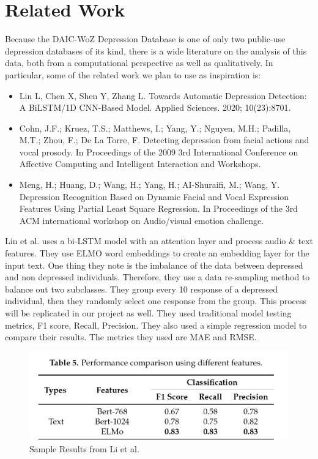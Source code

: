 \section{Related Work}

Because the DAIC-WoZ Depression Database is one of only two public-use depression databases of its kind, there is a wide literature on the analysis of this data, both from a computational perspective as well as qualitatively. In particular, some of the related work we plan to use as inspiration is:

\begin{itemize}
    \item Lin L, Chen X, Shen Y, Zhang L. Towards Automatic Depression Detection: A BiLSTM/1D CNN-Based Model. Applied Sciences. 2020; 10(23):8701. 
    \item Cohn, J.F.; Kruez, T.S.; Matthews, I.; Yang, Y.; Nguyen, M.H.; Padilla, M.T.; Zhou, F.; De La Torre, F. Detecting depression from facial actions and vocal prosody. In Proceedings of the 2009 3rd International Conference on Affective Computing and Intelligent Interaction and Workshops.
    \item Meng, H.; Huang, D.; Wang, H.; Yang, H.; AI-Shuraifi, M.; Wang, Y. Depression Recognition Based on Dynamic Facial and Vocal Expression Features Using Partial Least Square Regression. In Proceedings of the 3rd ACM international workshop on Audio/visual emotion challenge.
\end{itemize}





Lin et al. uses a bi-LSTM model with an attention layer and process audio & text features. They use ELMO word embeddings to create an embedding layer for the input text. One thing they note is the imbalance of the data between depressed and non depressed individuals. Therefore, they use a data re-sampling method to balance out two subclasses. They group every 10 response of a depressed individual, then they randomly select one response from the group. This process will be replicated in our project as well. They used traditional model testing metrics, F1 score, Recall, Precision. They also used a simple regression model to compare their results. The metrics they used are MAE and RMSE.

\begin{figure}[h!]
\centering
\caption{Sample Results from Li et al.}\label{PG_A1}
\shorthandoff{=}
\includegraphics[scale=0.5]{paper/sample_results.png} 
\shorthandoff{=}
\end{figure}


